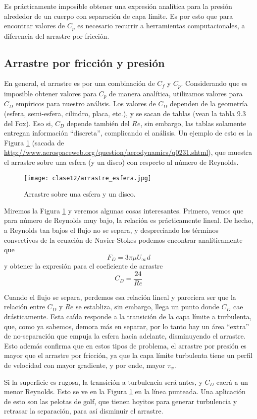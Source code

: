 Es prácticamente imposible obtener una expresión analítica para la presión alrededor de un cuerpo con separación de capa límite. 
Es por esto que para encontrar valores de $C_p$ es necesario recurrir a herramientas computacionales, a diferencia del arrastre por fricción.

\subsection*{Arrastre por fricción y presión}

En general, el arrastre es por una combinación de $C_f$ y $C_p$.
Considerando que es imposible obtener valores para $C_p$ de manera analítica, utilizamos valores para $C_D$ empíricos para nuestro análisis.
Los valores de $C_D$ dependen de la geometría (esfera, semi-esfera, cilindro, placa, etc.), y se sacan de tablas (vean la tabla 9.3 del Fox).
Eso si, $C_D$ depende también del $Re$, sin embargo, las tablas solamente entregan información ``discreta'', complicando el análisis.
Un ejemplo de esto es la Figura \ref{fig:arrastre_esfera} (sacada de \url{http://www.aerospaceweb.org/question/aerodynamics/q0231.shtml}), que muestra el arrastre sobre una esfera (y un disco) con respecto al número de Reynolds.
%
\begin{figure}
\centering
\texttt{[image: clase12/arrastre\_esfera.jpg]}
\caption{Arrastre sobre una esfera y un disco.}
\label{fig:arrastre_esfera}
\end{figure}

Miremos la Figura \ref{fig:arrastre_esfera} y veremos algunas cosas interesantes.
Primero, vemos que para número de Reynolds muy bajo, la relación es prácticamente lineal.
De hecho, a Reynolds tan bajos el flujo no se separa, y despreciando los términos convectivos de la ecuación de Navier-Stokes podemos encontrar analíticamente que
%
\begin{equation}
F_D = 3\pi\mu U_\infty d
\end{equation}
%
y obtener la expresión para el coeficiente de arrastre 
%
\begin{equation}
C_D = \frac{24}{Re}
\end{equation}

Cuando el flujo se separa, perdemos esa relación lineal y pareciera ser que la relación entre $C_D$ y $Re$ se establiza, sin embargo, llega un punto donde $C_D$ cae drásticamente. 
Esta caída responde a la transición de la capa límite a turbulenta, que, como ya sabemos, demora más en separar, por lo tanto hay un área ``extra'' de no-separación que empuja la esfera hacia adelante, disminuyendo el arrastre.
Esto además confirma que en estos tipos de problema, el arrastre por presión es mayor que el arrastre por fricción, ya que la capa límite turbulenta tiene un perfil de velocidad con mayor gradiente, y por ende, mayor $\tau_w$.

Si la superficie es rugosa, la transición a turbulencia será antes, y $C_D$ caerá a un menor Reynolds.
Esto se ve en la Figura \ref{fig:arrastre_esfera} en la línea punteada.
Una aplicación de esto son las pelotas de golf, que tienen hoyitos para generar turbulencia y retrasar la separación, para así disminuir el arrastre.
